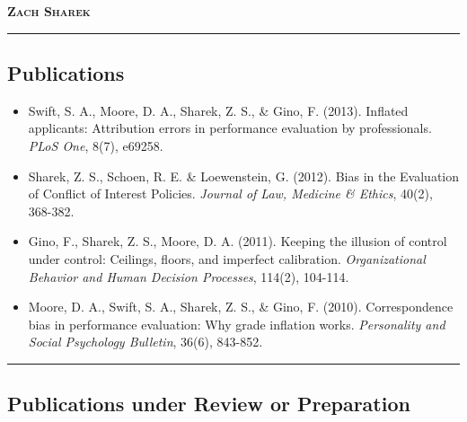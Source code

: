 \documentclass[12pt,letterpaper,oneside]{article}
\makeatletter
\newcommand{\headerrow}[2]
{\begin{tabular*}{\linewidth}{l@{\extracolsep{\fill}}r}
	#1 &
	#2 \\
\end{tabular*}}
\makeatother
\begin{document}
\begin{center}
{\LARGE \textbf{\textsc{Zach Sharek}}}
\vspace{4mm}

\end{center}
\vspace{-2mm}

\hrule
\vspace{-0.4em}
\subsection*{\centering\textbf{Publications}}

\begin{itemize}
	\parskip=0.1em
	\item Swift, S. A., Moore, D. A., Sharek, Z. S., \& Gino, F. (2013). 
	Inflated applicants: Attribution errors in performance evaluation by professionals. 
	\emph{PLoS One}, 8(7), e69258.
\end{itemize}

\begin{itemize}
	\parskip=0.1em
	\item Sharek, Z. S., Schoen, R. E. \& Loewenstein, G. (2012). Bias in the Evaluation of Conflict of Interest Policies.  
	\emph{Journal of Law, Medicine \& Ethics}, 40(2), 368-382.
\end{itemize}

\begin{itemize}
	\parskip=0.1em
	\item Gino, F., Sharek, Z. S., Moore, D. A. (2011).  Keeping the illusion of control under control: Ceilings, floors, and imperfect calibration.  \emph{Organizational Behavior and Human Decision Processes}, 114(2), 104-114.   
\end{itemize}

\begin{itemize}
	\parskip=0.1em
	\item Moore, D. A., Swift, S. A., Sharek, Z. S., \& Gino, F. (2010). Correspondence bias in performance evaluation: Why grade inflation works. \emph{Personality and Social Psychology Bulletin}, 36(6), 843-852.
\end{itemize}

\hrule
\vspace{-0.4em}
\subsection*{\centering\textbf{Publications under Review or Preparation}}
\end{document}
